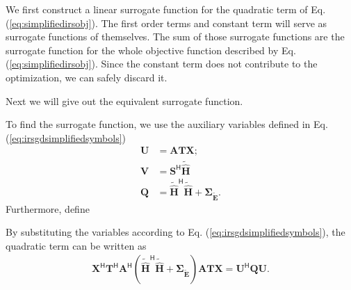 \documentclass[12pt,draftclsnofoot,onecolumn,journal]{IEEEtran}
\begin{document}
We first construct a linear surrogate function for the quadratic term of Eq. (\ref{eq:simplifiedirsobj}). The first order terms and constant term will serve as surrogate functions of themselves. The sum of those surrogate functions are the surrogate function for the whole objective function described by Eq. (\ref{eq:simplifiedirsobj}). Since the constant term does not contribute to the optimization, we can safely discard it.

Next we will give out the equivalent surrogate function.

To find the surrogate function, we use the auxiliary variables defined in Eq. (\ref{eq:irsgdsimplifiedsymbols})
\begin{equation}
\begin{split}
\mathbf U&= \mathbf{ATX};\\
\mathbf V&=\mathbf S^{\mathsf H}\tilde{\hat{\mathbf H}}\\
\mathbf Q&=\tilde{\hat{\mathbf H}}^{\mathsf H}\tilde{\hat{\mathbf H}}+
\pmb{\Sigma_{\tilde{\mathbf E}}}.
\end{split}
\nonumber
\end{equation}
Furthermore, define

By substituting the variables according to Eq. (\ref{eq:irsgdsimplifiedsymbols}), the quadratic term can be written as
\begin{equation}
\begin{split}
\mathbf X^{\mathsf H}\mathbf T^{\mathsf H} \mathbf A^{\mathsf H}\left(\tilde{\hat{\mathbf H}}^{\mathsf H}\tilde{\hat{\mathbf{H}}}+\pmb{\Sigma_{\tilde{\mathbf E}}}\right)\mathbf{ATX}=\mathbf U^{\mathsf H} \mathbf{QU}.
\end{split}
\end{equation}
\end{document}
